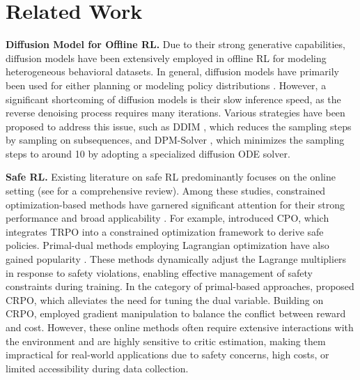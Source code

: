 \section{Related Work}
\textbf{Diffusion Model for Offline RL.} Due to their strong generative capabilities, diffusion models have been extensively employed in offline RL for modeling heterogeneous behavioral datasets. In general, diffusion models have primarily been used for either planning \cite{janner2022planning,he2024diffusion,ajay2022conditional} or modeling policy distributions \cite{chi2023diffusion,wang2022diffusion,fang2024diffusion,hansen2023idql,chen2023score,lu2023contrastive}. However, a significant shortcoming of diffusion models is their slow inference speed, as the reverse denoising process requires many iterations. Various strategies have been proposed to address this issue, such as DDIM \cite{song2020denoising}, which reduces the sampling steps by sampling on subsequences, and DPM-Solver \cite{lu2022dpm}, which minimizes the sampling steps to around 10 by adopting a specialized diffusion ODE solver.


\textbf{Safe RL.} 
Existing literature on safe RL predominantly focuses on the online setting (see \citet{gu2022review} for a comprehensive review).
Among these studies, constrained optimization-based methods have garnered significant attention for their strong performance and broad applicability \citep{achiam2017constrained,tessler2018reward,yangprojection,liu2022constrained}.
For example, \citet{achiam2017constrained} introduced CPO, which integrates TRPO \citep{schulman2015trust} into a constrained optimization framework to derive safe policies.
Primal-dual methods employing Lagrangian optimization have also gained popularity \citep{chow2018risk,calian2020balancing,ding2020natural,ying2022dual,zhou2023gradient}.
These methods dynamically adjust the Lagrange multipliers in response to safety violations, enabling effective management of safety constraints during training.
In the category of primal-based approaches, \citet{xu2021crpo} proposed CRPO, which alleviates the need for tuning the dual variable.
Building on CRPO, \citet{gu2024balance} employed gradient manipulation to balance the conflict between reward and cost.
However, these online methods often require extensive interactions with the environment and are highly sensitive to critic estimation, making them impractical for real-world applications due to safety concerns, high costs, or limited accessibility
during data collection.





